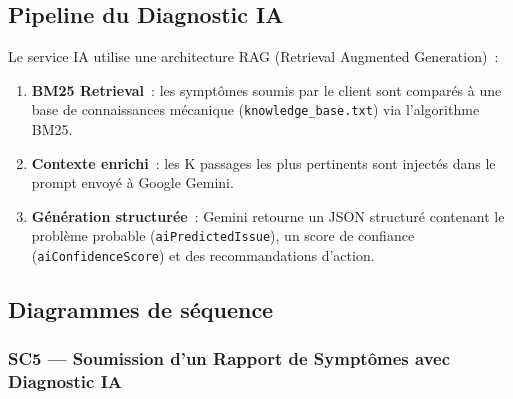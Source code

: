 \documentclass[12pt,a4paper]{report}
\begin{document}
\subsection{Pipeline du Diagnostic IA}

Le service IA utilise une architecture RAG (Retrieval Augmented Generation)~:

\begin{enumerate}[noitemsep]
  \item \textbf{BM25 Retrieval}~: les symptômes soumis par le client sont comparés
    à une base de connaissances mécanique (\texttt{knowledge\_base.txt}) via l'algorithme BM25.
  \item \textbf{Contexte enrichi}~: les K passages les plus pertinents sont injectés
    dans le prompt envoyé à Google Gemini.
  \item \textbf{Génération structurée}~: Gemini retourne un JSON structuré contenant
    le problème probable (\texttt{aiPredictedIssue}), un score de confiance
    (\texttt{aiConfidenceScore}) et des recommandations d'action.
\end{enumerate}

\subsection{Diagrammes de séquence}

\subsubsection*{SC5 — Soumission d'un Rapport de Symptômes avec Diagnostic IA}
\end{document}
